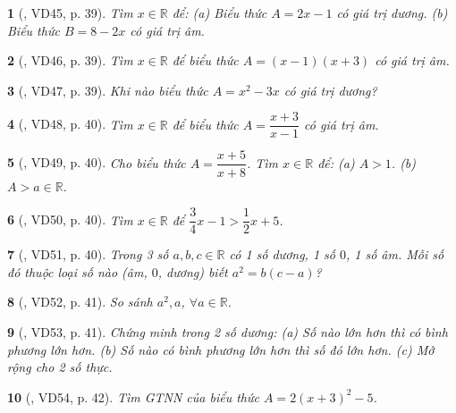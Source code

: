 \documentclass{article}
\newtheorem{baitoan}{}
\begin{document}
\begin{baitoan}[\cite{Binh_Toan_7_tap_1}, VD45, p. 39]
	Tìm $x\in\mathbb{R}$ để: (a) Biểu thức $A = 2x - 1$ có giá trị dương. (b) Biểu thức $B = 8 - 2x$ có giá trị âm.
\end{baitoan}

\begin{baitoan}[\cite{Binh_Toan_7_tap_1}, VD46, p. 39]
	Tìm $x\in\mathbb{R}$ để biểu thức $A = (x - 1)(x + 3)$ có giá trị âm.
\end{baitoan}

\begin{baitoan}[\cite{Binh_Toan_7_tap_1}, VD47, p. 39]
	Khi nào biểu thức $A = x^2 - 3x$ có giá trị dương?
\end{baitoan}

\begin{baitoan}[\cite{Binh_Toan_7_tap_1}, VD48, p. 40]
	Tìm $x\in\mathbb{R}$ để biểu thức $A = \dfrac{x + 3}{x - 1}$ có giá trị âm.
\end{baitoan}

\begin{baitoan}[\cite{Binh_Toan_7_tap_1}, VD49, p. 40]
	Cho biểu thức $A = \dfrac{x + 5}{x + 8}$. Tìm $x\in\mathbb{R}$ để: (a) $A > 1$. (b) $A > a\in\mathbb{R}$.
\end{baitoan}

\begin{baitoan}[\cite{Binh_Toan_7_tap_1}, VD50, p. 40]
	Tìm $x\in\mathbb{R}$ để $\dfrac{3}{4}x - 1 > \dfrac{1}{2}x + 5$.
\end{baitoan}

\begin{baitoan}[\cite{Binh_Toan_7_tap_1}, VD51, p. 40]
	Trong 3 số $a,b,c\in\mathbb{R}$ có 1 số dương, 1 số $0$, 1 số âm. Mỗi số đó thuộc loại số nào (âm, $0$, dương) biết $a^2 = b(c - a)$?
\end{baitoan}

\begin{baitoan}[\cite{Binh_Toan_7_tap_1}, VD52, p. 41]
	So sánh $a^2,a$, $\forall a\in\mathbb{R}$.
\end{baitoan}

\begin{baitoan}[\cite{Binh_Toan_7_tap_1}, VD53, p. 41]
	Chứng minh trong 2 số dương: (a) Số nào lớn hơn thì có bình phương lớn hơn. (b) Số nào có bình phương lớn hơn thì số đó lớn hơn. (c) Mở rộng cho 2 số thực.
\end{baitoan}

\begin{baitoan}[\cite{Binh_Toan_7_tap_1}, VD54, p. 42]
	Tìm {\rm GTNN} của biểu thức $A = 2(x + 3)^2 - 5$.
\end{baitoan}
\end{document}
